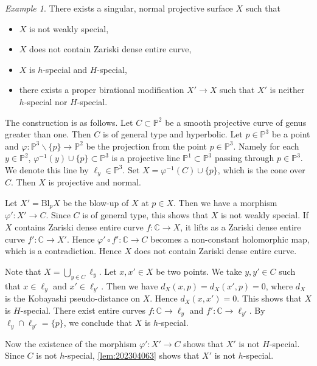 \documentclass[11pt,english]{smfart}
\theoremstyle{plain}
\theoremstyle{definition}
\theoremstyle{remark}
\newtheorem{example}[thm]{Example}
\numberwithin{equation}{subsection}
\theoremstyle{plain}
\begin{document}
 
\begin{example}\label{ex:20230418}
There exists a singular, normal projective surface $X$ such that
\begin{itemize}
\item $X$ is not weakly special,
\item $X$ does not contain Zariski dense entire curve,
\item $X$ is $h$-special and $H$-special,
\item
there exists a proper birational modification $X'\to X$ such that $X'$ is neither $h$-special nor $H$-special.
\end{itemize}

The construction is as follows.
Let $C\subset \mathbb P^2$ be a smooth projective curve of genus greater than one.
Then $C$ is of general type and hyperbolic.
Let $p\in \mathbb P^3$ be a point and $\varphi:\mathbb P^3\backslash\{p\}\to\mathbb P^2$ be the projection from the point $p\in\mathbb P^3$.
Namely for each $y\in\mathbb P^2$, $\varphi^{-1}(y)\cup\{p\}\subset \mathbb P^3$ is a projective line  $\mathbb P^1\subset \mathbb P^3$ passing through $p\in\mathbb P^3$.
We denote this line by $\ell_y\in\mathbb P^3$.
Set $X=\varphi^{-1}(C)\cup\{p\}$, which is the cone over $C$.
Then $X$ is projective and normal.


Let $X'=\mathrm{Bl}_pX$ be the blow-up of $X$ at $p\in X$.
Then we have a morphism $\varphi':X'\to C$.
Since $C$ is of general type, this shows that $X$ is not weakly special.
If $X$ contains Zariski dense entire curve $f:\mathbb C\to X$, it lifts as a Zariski dense entire curve $f':\mathbb C \to X'$.
Hence $\varphi'\circ f':\mathbb C\to C$ becomes a non-constant holomorphic map, which is a contradiction.
Hence $X$ does not contain Zariski dense entire curve.

Note that $X=\bigcup_{y\in C}\ell_y$.
Let $x,x'\in X$ be two points.
We take $y,y'\in C$ such that $x\in\ell_{y}$ and $x'\in\ell_{y'}$.
Then we have $d_X(x,p)=d_X(x',p)=0$, where $d_X$ is the Kobayashi pseudo-distance on $X$.
Hence $d_X(x,x')=0$.
This shows that $X$ is $H$-special.
There exist entire curves $f:\mathbb C\to\ell_y$ and $f':\mathbb C\to \ell_{y'}$.
By $\ell_y\cap\ell_{y'}=\{p\}$, we conclude that $X$ is $h$-special.

Now the existence of the morphism $\varphi':X'\to C$ shows that $X'$ is not $H$-special.
Since $C$ is not $h$-special, \cref{lem:202304063} shows that $X'$ is not $h$-special.
\end{example}
\end{document}
